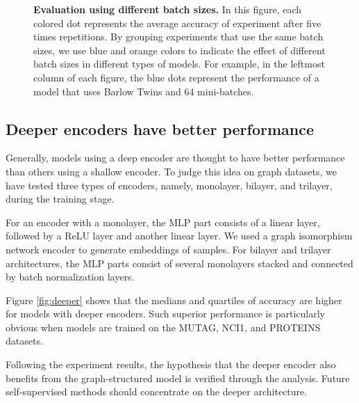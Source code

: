 \begin{figure}[htbp]
\vspace{0.5cm}
\caption[Evaluation using different batch sizes]{\textbf{Evaluation using different batch sizes.} In this figure, each colored dot represents the average accuracy of experiment after five times repetitions. By grouping experiments that use the same batch sizes, we use blue and orange colors to indicate the effect of different batch sizes in different types of models. For example, in the leftmost column of each figure, the blue dots represent the performance of a model that uses Barlow Twins and 64 mini-batches.} \label{fig:simclrbatch}
\end{figure}









\subsection{Deeper encoders have better performance}

Generally, models using a deep encoder are thought to have better performance than others using a shallow encoder. To judge this idea on graph datasets, we have tested three types of encoders, namely, monolayer, bilayer, and trilayer, during the training stage. 

For an encoder with a monolayer, the MLP part consists of a linear layer, followed by a ReLU layer and another linear layer. We used a graph isomorphism network encoder to generate embeddings of samples. For bilayer and trilayer architectures, the MLP parts consist of several monolayers stacked and connected by batch normalization layers.

Figure \ref{fig:deeper} shows that the medians and quartiles of accuracy are higher for models with deeper encoders. Such superior performance is particularly obvious when models are trained on the MUTAG, NCI1, and PROTEINS datasets.


Following the experiment results, the hypothesis that the deeper encoder also benefits from the graph-structured model is verified through the analysis. Future self-supervised methods should concentrate on the deeper architecture.


